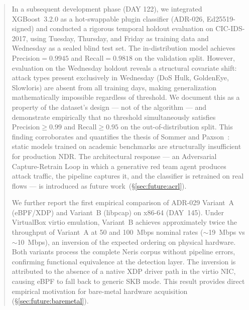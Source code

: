 \documentclass[11pt,a4paper]{article}
\begin{document}
\begin{abstract}
        In a subsequent development phase (DAY 122), we integrated XGBoost~3.2.0 as a hot-swappable
        plugin classifier (ADR-026, Ed25519-signed) and conducted a rigorous temporal holdout
        evaluation on CIC-IDS-2017, using Tuesday, Thursday, and Friday as training data and
        Wednesday as a sealed blind test set. The in-distribution model achieves
        Precision$=0.9945$ and Recall$=0.9818$ on the validation split. However, evaluation
        on the Wednesday holdout reveals a structural covariate shift: attack types present
        exclusively in Wednesday (DoS Hulk, GoldenEye, Slowloris) are absent from all training
        days, making generalization mathematically impossible regardless of threshold. We document
        this as a property of the dataset's design --- not of the algorithm --- and demonstrate
        empirically that no threshold simultaneously satisfies Precision$\geq0.99$ and
        Recall$\geq0.95$ on the out-of-distribution split. This finding corroborates and
        quantifies the thesis of Sommer and Paxson~\cite{sommer2010}: static models trained on
        academic benchmarks are structurally insufficient for production NDR.
        The architectural response --- an Adversarial Capture-Retrain Loop in which a generative
        red team agent produces attack traffic, the pipeline captures it, and the classifier is
        retrained on real flows --- is introduced as future work~(\S\ref{sec:future:acrl}).

        We further report the first empirical comparison of ADR-029 Variant~A (eBPF/XDP) and
        Variant~B (libpcap) on x86-64 (DAY~145). Under VirtualBox virtio emulation, Variant~B
        achieves approximately twice the throughput of Variant~A at 50 and 100~Mbps nominal
        rates (${\sim}$19~Mbps vs ${\sim}$10~Mbps), an inversion of the expected ordering on
        physical hardware. Both variants process the complete Neris corpus without pipeline
        errors, confirming functional equivalence at the detection layer. The inversion is
        attributed to the absence of a native XDP driver path in the virtio NIC, causing
        eBPF to fall back to generic SKB mode. This result provides direct empirical motivation
        for bare-metal hardware acquisition (\S\ref{sec:future:baremetal}).


\end{abstract}
\end{document}
